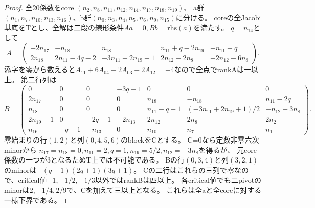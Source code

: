 \documentclass[a4paper,11pt]{ltjsarticle}
\theoremstyle{definition}
\begin{document}
\begin{proof}
全20係数をcore $(n_2,n_8,n_{11},n_{12},n_{14},n_{17},n_{18},n_{19})$、
a群$(n_1,n_7,n_{10},n_{13},n_{16})$、b群$(n_0,n_3,n_4,n_5,n_6,n_9,n_{15})$に分ける。
coreの全Jacobi基底をTとし、全解は二段の線形条件$Aa=0,Bb=\mathrm{rhs}(a)$を満たす。
$q=n_{14}$として
\[
 A=\begin{pmatrix}
 -2n_{17}&-n_{18}&n_{18}&n_{11}+q-2n_{19}&-n_{11}+q\\
 2n_{18}&2n_{11}-4q-2&-3n_{11}+2n_{19}+1&2n_{12}+2n_8&-2n_{12}-6n_8
 \end{pmatrix}.
\]
添字を零から数えると$A_{11}+6A_{04}-2A_{03}-2A_{12}=-4$なので全点でrankAは一以上。
第二行列は
{\small
\[
 B=\begin{pmatrix}
 0&0&0&-3q-1&0&0&0\\
 2n_{17}&0&0&0&n_{18}&-n_{18}&n_{11}-2q\\
 n_{18}&0&0&0&n_{11}-q-1&(-3n_{11}+2n_{19}+1)/2&-n_{12}-3n_8\\
 2n_{19}+1&0&-2q-1&-2n_{13}&2n_{12}&2n_8&2n_2\\
 n_{16}&-q-1&-n_{13}&0&n_{10}&n_7&n_1
 \end{pmatrix}.
\]
}
零始まりの行$(1,2)$と列$(0,4,5,6)$のblockをCとする。
C=0なら定数非零六次minorから
$n_{17}=n_{18}=0,n_{11}=2,q=1,n_{19}=5/2,n_{12}=-3n_8$を得るが、
元core係数の一つが3となるためT上では不可能である。
Bの行$(0,3,4)$と列$(3,2,1)$のminorは$-(q+1)(2q+1)(3q+1)$。
Cの二行はこれらの三列で零なので、critical値$-1,-1/2,-1/3$以外ではrankBは四以上。
各critical値でも二pivotのminorは$2,-1/4,2/9$で、Cを加えて三以上となる。
これらは全aと全coreに対する一様下界である。


\end{proof}
\end{document}
